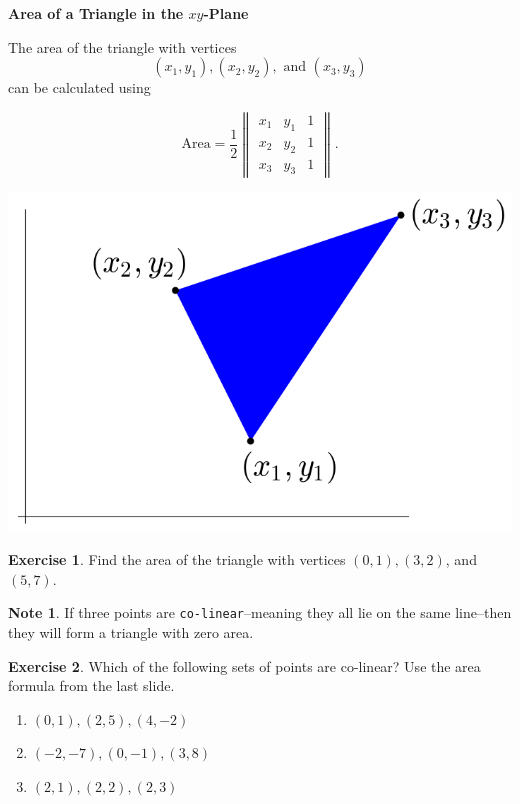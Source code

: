\documentclass{beamer}
\newcommand{\fn}{\insertframenumber}
\theoremstyle{definition}
\newtheorem{exercise}{Exercise}
\newtheorem*{nb}{Note}
\renewcommand{\emph}[1]{{\color{blue}\texttt{#1}}}
\begin{document}
\begin{frame}{\fn}
	\begin{block}{\textbf{Area of a Triangle in the $xy$-Plane}}
		\begin{minipage}{.65\textwidth}
			The area of the triangle with vertices	\[(x_1,y_1), (x_2,y_2), \text{ and } (x_3,y_3)\] can be calculated using
		
			\[\text{Area}=\frac{1}{2}\begin{Vmatrix}x_1&y_1&1\\x_2&y_2&1\\x_3&y_3&1\end{Vmatrix}.\]
		\end{minipage}
		\begin{minipage}{.3\textwidth}
			\includegraphics[width=\textwidth]{../images/triangle}
		\end{minipage}
	\end{block}
	\begin{exercise}
		Find the area of the triangle with vertices $(0,1),(3,2)$, and $(5,7)$.
	\end{exercise}
\end{frame}

\begin{frame}{\fn}
	\begin{nb}
		If three points are \emph{co-linear}--meaning they all lie on the same line--then they will form a triangle with zero area.  
	\end{nb}
	\begin{exercise} Which of the following sets of points are co-linear?  Use the area formula from the last slide.
		\begin{enumerate}[label=(\alph*)]
			\item $(0,1),(2,5),(4,-2)$
			\item $(-2,-7),(0,-1),(3,8)$
			\item $(2,1),(2,2),(2,3)$
		\end{enumerate}
	\end{exercise}
\end{frame}
\end{document}
